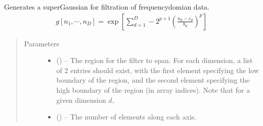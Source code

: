 \documentclass[letterpaper,10pt,english]{sphinxmanual}
\begin{document}
\begin{fulllineitems}
\label{\detokenize{references/freqfilter:nmrespy.freqfilter.super_gaussian}}
\sphinxAtStartPar
Generates a super\sphinxhyphen{}Gaussian for filtration of frequency\sphinxhyphen{}domian data.
\begin{equation*}
\begin{split}g\left[n_1, \cdots, n_D\right] =
\exp \left[ \sum\limits_{d=1}^D -2^{p+1}
\left(\frac{n_d - c_d}{b_d}\right)^p\right]\end{split}
\end{equation*}\begin{quote}\begin{description}
\item[{Parameters}] \leavevmode\begin{itemize}
\item {} 
\sphinxAtStartPar
{} (\sphinxstyleliteralemphasis{\sphinxupquote{{[}}}\sphinxstyleliteralemphasis{\sphinxupquote{{[}}}\sphinxstyleliteralemphasis{\sphinxupquote{, }}\sphinxstyleliteralemphasis{\sphinxupquote{{]}}}\sphinxstyleliteralemphasis{\sphinxupquote{{]} or }}\sphinxstyleliteralemphasis{\sphinxupquote{{[}}}\sphinxstyleliteralemphasis{\sphinxupquote{{[}}}\sphinxstyleliteralemphasis{\sphinxupquote{, }}\sphinxstyleliteralemphasis{\sphinxupquote{{]}}}\sphinxstyleliteralemphasis{\sphinxupquote{, }}\sphinxstyleliteralemphasis{\sphinxupquote{{[}}}\sphinxstyleliteralemphasis{\sphinxupquote{, }}\sphinxstyleliteralemphasis{\sphinxupquote{{]}}}\sphinxstyleliteralemphasis{\sphinxupquote{{]}}}) – The region for the filter to span. For each dimension, a list
of 2 entries should exist, with the first element specifying the
low boundary of the region, and the second element specifying the
high boundary of the region (in array indices). Note that for a given
dimension \(d\),

\item {} 
\sphinxAtStartPar
{} (\sphinxstyleliteralemphasis{\sphinxupquote{{[}}}\sphinxstyleliteralemphasis{\sphinxupquote{{]} or }}\sphinxstyleliteralemphasis{\sphinxupquote{{[}}}\sphinxstyleliteralemphasis{\sphinxupquote{, }}\sphinxstyleliteralemphasis{\sphinxupquote{{]}}}) – The number of elements along each axis.


\end{itemize}
\end{description}
\end{quote}
\end{fulllineitems}
\end{document}
